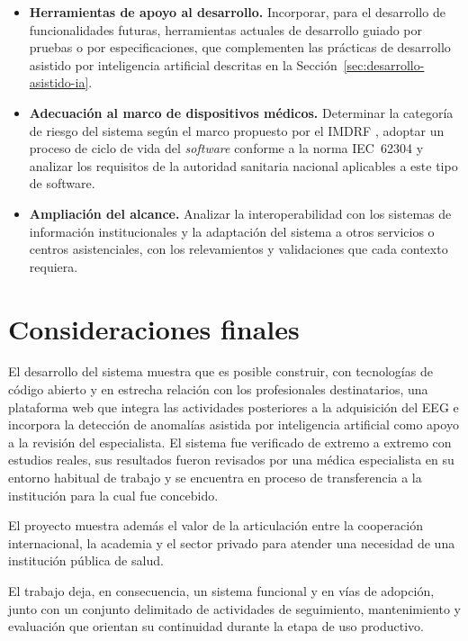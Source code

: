 \begin{itemize}
    \item \textbf{Herramientas de apoyo al desarrollo.}
    Incorporar, para el desarrollo de funcionalidades futuras, herramientas actuales de desarrollo guiado por pruebas o por especificaciones, que complementen las prácticas de desarrollo asistido por inteligencia artificial descritas en la Sección~\ref{sec:desarrollo-asistido-ia}.

    \item \textbf{Adecuación al marco de dispositivos médicos.}
    Determinar la categoría de riesgo del sistema según el marco propuesto por el IMDRF \citep{IMDRF2014SaMDRisk}, adoptar un proceso de ciclo de vida del \textit{software} conforme a la norma IEC~62304 \citep{IEC62304:2006} y analizar los requisitos de la autoridad sanitaria nacional aplicables a este tipo de software.

    \item \textbf{Ampliación del alcance.}
    Analizar la interoperabilidad con los sistemas de información institucionales y la adaptación del sistema a otros servicios o centros asistenciales, con los relevamientos y validaciones que cada contexto requiera.
\end{itemize}


\section{Consideraciones finales}
\label{sec:consideraciones-finales}

El desarrollo del sistema muestra que es posible construir, con tecnologías de código abierto y en estrecha relación con los profesionales destinatarios, una plataforma web que integra las actividades posteriores a la adquisición del EEG e incorpora la detección de anomalías asistida por inteligencia artificial como apoyo a la revisión del especialista.
El sistema fue verificado de extremo a extremo con estudios reales, sus resultados fueron revisados por una médica especialista en su entorno habitual de trabajo y se encuentra en proceso de transferencia a la institución para la cual fue concebido.

El proyecto muestra además el valor de la articulación entre la cooperación internacional, la academia y el sector privado para atender una necesidad de una institución pública de salud.

El trabajo deja, en consecuencia, un sistema funcional y en vías de adopción, junto con un conjunto delimitado de actividades de seguimiento, mantenimiento y evaluación que orientan su continuidad durante la etapa de uso productivo.
